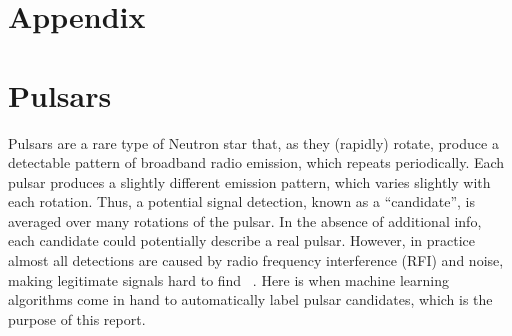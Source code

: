 \appendix
\section*{Appendix}
\label{sec:appendix}
\section{Pulsars}
Pulsars are a rare type of Neutron star that, as they (rapidly) rotate, produce 
a detectable pattern of broadband radio emission, which repeats periodically.
Each pulsar produces a slightly different emission pattern, which varies slightly
with each rotation. 
Thus, a potential signal detection, known as a ``candidate'', is averaged over many
rotations of the pulsar.
In the absence of additional info, each candidate could potentially describe a
real pulsar.
However, in practice almost all detections are caused by radio frequency
interference (RFI) and noise, making legitimate signals hard to find
~\cite{2016MNRAS.459.1104L, 2010MNRAS.409..619K, 2004hpa..book.....L}.
Here is when machine learning algorithms come in hand to automatically label
pulsar candidates, which is the purpose of this report.

